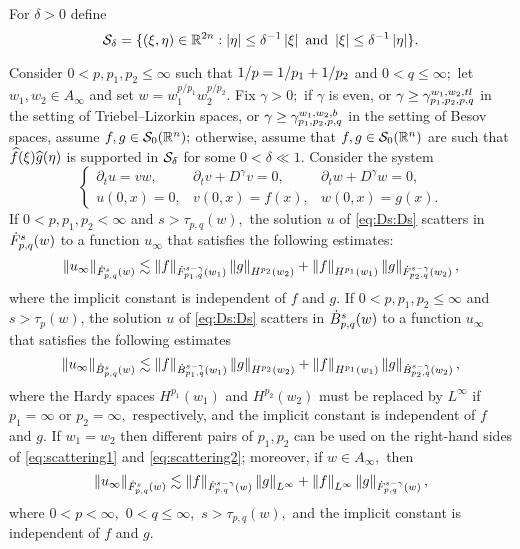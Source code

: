 For $\delta>0$ define
$$
\Ss_{\delta}=\{(\xi,\eta)\in \re^{2n}: \abs{\eta}\le \delta^{-1}\abs{\xi}\text{ and }\abs{\xi}\le \delta^{-1}\abs{\eta}\}.
$$
 
 
 \begin{theorem}\label{thm:scattering} Consider  $0 < p, p_1, p_2  \le \infty$  such that $\hcline$ and  $0 < q \leq \infty;$ let  $w_1,w_2\in A_\infty$ and set $w=w_1^{{p}/{p_1}} w_2^{{p}/{p_2}}.$ 
Fix $\gamma>0;$ if $\gamma$ is even, or $\gamma\ge \gamt$ in the setting of Triebel--Lizorkin spaces, or $\gamma\ge \gamb$ in the setting of Besov spaces, assume $f, g \in \swz;$ otherwise, assume that $f,g\in\swz$ are such that $\fhat(\xi)\ghat(\eta)$ is supported in $\Ss_{\delta}$ for some $0<\delta\ll1.$ Consider the system 
\begin{equation}\label{eq:Ds:Ds}
\left\{ \begin{array}{lll}  \partial_t u =vw, & \partial_t v +D^\gamma v = 0, & \partial_t w + D^\gamma w = 0, \\
  u(0,x)=0,&v(0,x)=f(x),&w(0,x) = g(x).
 \end{array} \right.
\end{equation}
If $0 < p,p_1,p_2 < \infty$ and  $s > \tau_{p,q}(w),$ the solution $u$ of \eqref{eq:Ds:Ds}  scatters in $\tlw{p}{s}{q}{w}$ to a function $u_\infty$ that satisfies the following estimates: 
\begin{equation}\label{eq:scattering1}
\norm{u_\infty}{\tlw{p}{s}{q}{w}} \lesssim \norm{f}{\tlw{p_1}{s-\gamma}{q}{w_1} } \norm{g}{H^{p_2}(w_2)} +  \norm{f}{H^{p_1}(w_1)}   \norm{g}{\tlw{p_2}{s-\gamma}{q}{w_2} },
\end{equation}
where the implicit constant is independent of $f$ and $g.$
If $0< p, p_1,p_2\leq \infty$ and $s > \tau_p(w)$, the solution $u$ of \eqref{eq:Ds:Ds}  scatters in $\besw{p}{s}{q}{w}$ to a function $u_\infty$ that satisfies the following estimates
\begin{equation}\label{eq:scattering2}
\norm{u_\infty}{\besw{p}{s}{q}{w}} \lesssim \norm{f}{\besw{p_1}{s-\gamma}{q}{w_1} } \norm{g}{H^{p_2}(w_2)} +  \norm{f}{H^{p_1}(w_1)}   \norm{g}{\besw{p_2}{s-\gamma}{q}{w_2} },
\end{equation}
where the Hardy spaces $H^{p_1}(w_1)$ and $H^{p_2}(w_2)$ must be replaced by $L^\infty$ if $p_1=\infty$ or $p_2=\infty,$ respectively, and the implicit constant is independent of $f$ and $g.$ 
If $w_1=w_2$ then different pairs of $p_1, p_2$ can be used on the right-hand sides of \eqref{eq:scattering1} and \eqref{eq:scattering2}; moreover, if $w\in A_\infty,$ then 
\begin{equation*}
\norm{u_\infty}{\tlw{p}{s}{q}{w}} \lesssim \norm{f}{\tlw{p}{s-\gamma}{q}{w} } \norm{g}{L^\infty} +  \norm{f}{L^\infty}   \norm{g}{\tlw{p}{s-\gamma}{q}{w}},
\end{equation*}
where $0<p<\infty,$ $0<q\le\infty,$  $s>\tau_{p,q}(w),$ and the implicit constant is independent of $f$ and $g.$ 
\end{theorem} 






